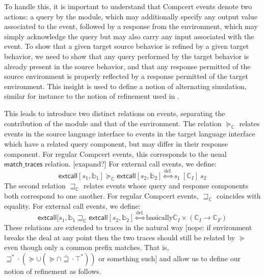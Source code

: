 \documentclass[sigplan,10pt,review,anonymous]{acmart}
\newcommand{\kw}[1]{\ensuremath{ \textsf{#1} }}
\begin{document}
To handle this,
it is important to understand that Compcert events
denote two actions:
a query by the module,
which may additionally specify any output value
associated to the event,
followed by a response from the environment,
which may simply acknowledge the query
but may also carry any input associated with the event.
To show that
a given target source behavior is refined by
a given target behavior,
we need to show that any query performed by the target behavior
is already present in the source behavior,
and that any response permitted of the source environment
is properly reflected by
a response permitted of the target environment.
This insight is used to define a notion of alternating simulation,
similar for instance to the notion of refinement used in \cite{ia}.

This leads to introduce two distinct relations on events,
separating the contribution of the module and that of the environment.
The relation $\succeq_\mathbb{C}$
relates events in the source language interface
to events in the target language interface
which have a related query component,
but may differ in their response component.
For regular Compcert events,
this corresponds to the usual $\kw{match\_traces}$ relation.
[exapand?]
For external call events, we define:
\[
  \kw{extcall}[s_1, \mathbb{b}_1]
  \succeq_\mathbb{C}
  \kw{extcall}[s_2, \mathbb{b}_2]
  \stackrel{\text{def.}}{\Leftrightarrow}
  s_1 \: [\mathbb{C}_I] \: s_2
\]
The second relation $\sqsupseteq_\mathbb{C}$
relates events whose query and response components
both correspond to one another.
For regular Compcert events,
$\sqsupseteq_\mathbb{C}$ coincides with equality.
For external call events, we define:
\[
  \kw{extcall}[s_1, \mathbb{b}_1
  \sqsupseteq_\mathbb{C}
  \kw{extcall}[s_2, \mathbb{b}_2]
  \stackrel{\text{def.}}{\Leftrightarrow}
  \text{basically} \mathbb{C}_I \times (\mathbb{C}_I \rightarrow \mathbb{C}_F)
\]
These relations are extended to traces in the natural way
[nope: if environment breaks the deal at any point
then the two traces should still be related by $\succeq$
even though only a common prefix matches.
That is, $\sqsupseteq^* \cdot (\succeq \cup (\succeq \cap \bar{\sqsupseteq} \cdot \top^*))$
or something such]
and allow us to define
our notion of refinement as follows.
\end{document}
